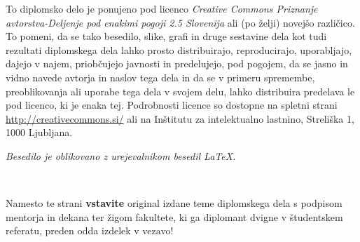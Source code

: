 \documentclass[12pt,a4paper,openany,tikz]{book}
\theoremstyle{plain}
\theoremstyle{definition}
\begin{document}

\thispagestyle{empty}

\vspace*{5cm}
{\small \noindent
To diplomsko delo je ponujeno pod licenco \textit{Creative Commons Priznanje avtorstva-Deljenje pod enakimi pogoji 2.5 Slovenija}
ali (po želji) novejšo različico.
To pomeni, da se tako besedilo, slike, grafi in druge sestavine dela kot tudi rezultati diplomskega dela lahko prosto distribuirajo,
reproducirajo, uporabljajo, dajejo v najem, priobčujejo javnosti in predelujejo, pod pogojem, da se jasno in vidno navede avtorja in naslov tega
dela in da se v primeru spremembe, preoblikovanja ali uporabe tega dela v svojem delu, lahko distribuira predelava le pod
licenco, ki je enaka tej.
Podrobnosti licence so dostopne na spletni strani \url{http://creativecommons.si/} ali na Inštitutu za
intelektualno lastnino, Streliška 1, 1000 Ljubljana.

\begin{center}%
  \hspace*{1ex}
\end{center}
}

\begin{center}
\vfill
{\em
Besedilo je oblikovano z urejevalnikom besedil \LaTeX.
}
\end{center}

\newpage

\ \thispagestyle{empty}

\newpage


\thispagestyle{empty}

Namesto te strani {\bf vstavite} original izdane teme diplomskega dela s podpisom mentorja in dekana ter žigom fakultete, ki ga diplomant
dvigne v študentskem referatu, preden odda izdelek v vezavo!

\newpage


\ \thispagestyle{empty}

\newpage



\thispagestyle{empty}
\end{document}
